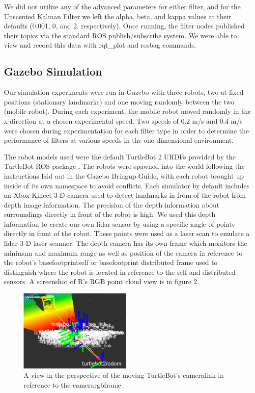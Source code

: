 \documentclass[conference]{IEEEtran} \usepackage[T1]{fontenc} \usepackage[backend=biber, style=ieee]{biblatex}
\begin{document}
We did not utilize any of the advanced parameters for either filter, and for the Unscented Kalman Filter we left the
alpha, beta, and kappa values at their defaults (0.001, 0, and 2, respectively). Once running, the filter nodes
published their topics via the standard ROS publish/subscribe system. We were able to view and record this data 
with rqt\_plot and rosbag commands.


\subsection{Gazebo Simulation} \label{Gazebo Simulation} Our simulation experiments were run in Gazebo with three
robots, two at fixed positions (stationary landmarks) and one moving randomly between the two (mobile robot). During
each experiment, the mobile robot moved randomly in the x-direction at a chosen experimental speed. Two speeds of 0.2
m/s and 0.4 m/s were chosen during experimentation for each filter type in order to determine the performance of filters
at various speeds in the one-dimensional environment.

The robot models used were the default TurtleBot 2 URDFs provided by the TurtleBot ROS package \cite{turtlebot}. The
robots were spawned into the world following the instructions laid out in the Gazebo Bringup Guide, with each robot
brought up inside of its own namespace to avoid conflicts. Each simulator by default includes an Xbox Kinect 3-D
camera used to detect landmarks in from of the robot from depth image information. The precision of the depth information
about surroundings directly in front of the robot is high. We used this depth information to create our own lidar 
sensor by using a specific angle of points directly in front of the robot. These points were used as a laser scan to emulate
a lidar 3-D laser scanner. The depth camera has its own frame which monitors the minimum and maximum range as well as position
of the camera in reference to the robot's base\textunderscore footprint\textunderscore self or base\textunderscore footprint\textunderscore
distributed frame used to distinguish where the
robot is located in reference to the self and distributed sensors. A screenshot of R's RGB point cloud view is in figure 2.

\begin{figure}
\label{pic2} 
\centering 
\includegraphics[width=0.49\textwidth]{t2_camera_link}
\caption{A view in the perspective of the moving TurtleBot's camera\textunderscore link in reference to the camera\textunderscore rgb\textunderscore frame.}
\end{figure}
\end{document}
